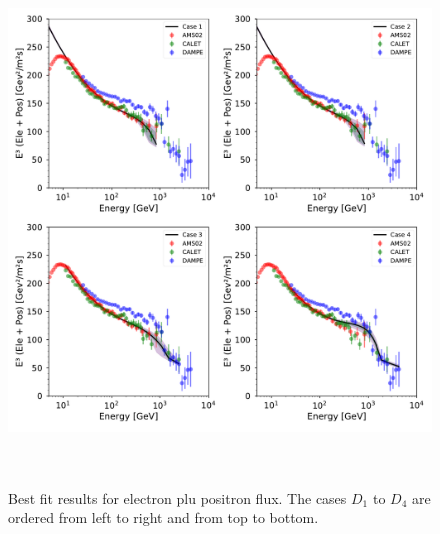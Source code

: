 \documentclass[a4paper,11pt]{article}
\begin{document}
\begin{figure}[htb]
\begin{center}
\includegraphics[height=14cm,width=14cm,angle=0]{Figures/pymultinest_fit_case_5_electron_plus_positron.pdf}
\caption{Best fit results for electron plu positron flux. The cases $D_1$ to $D_4$ are ordered from left to right and from top to bottom.}
\label{fig:bf-electron-plus-positron-fraction-spectrum}
\end{center}
\end{figure}
\end{document}
